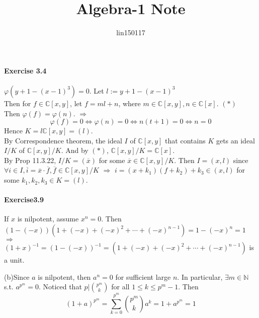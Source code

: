 \documentclass{article}
\title{Algebra-1 Note}
\author{lin150117 }
\date{}
\begin{document}
\setlength{\parindent}{0pt}
\paragraph{Exercise 3.4}


$ \varphi(y+1-(x-1)^3)=0 $. Let  $ l:=y+1-(x-1)^3 $ \\
Then for  $ f\in \mathbb{C}[x,y] $, let  $ f=ml+n $, where  $ m\in \mathbb{C}[x,y],n\in\mathbb{C}[x] $. $ (\ast ) $ \\
Then  $ \varphi(f)=\varphi(n) $. $ \Rightarrow $ 
\[\varphi(f)=0\Leftrightarrow \varphi(n)=0\Leftrightarrow n(t+1)=0\Leftrightarrow n=0\]    
Hence  $ K=l\mathbb{C}[x,y]=(l) $.\\
By Correspondence theorem, the ideal  $ I  $ of  $ \mathbb{C}[x,y] $ that contains  $ K  $  gets an ideal  $ I/K $ of  $ \mathbb{C}[x,y]/K $. And by  $ (\ast)  $,  $ \mathbb{C}[x,y]/K=\mathbb{C}[x] $.\\
By Prop 11.3.22,  $ I/K=(\overline{x}) $ for some  $ \overline{x}\in  \mathbb{C}[x,y]/K  $. Then  $ I=(x,l) $ since  $ \forall i\in I,\overline{i}=\overline{x}\cdot \overline{f},\overline{f}\in \mathbb{C }[x,y]/K $ $ \Rightarrow  $  $ i=(x+k_1)(f+k_2)+k_3\in (x,l) $ for some $ k_1,k_2,k_3\in K=(l) $.  

\paragraph{Exercise3.9}

If  $ x  $ is nilpotent, assume   $ x^n=0 $. Then  $ (1-(-x))(1+(-x)+(-x)^2+\cdots+(-x)^{n-1})=1-(-x)^n=1 $  $ \Rightarrow $  $ (1+x)^{-1}=(1-(-x))^{-1}=(1+(-x)+(-x)^2+\cdots+(-x)^{n-1}) $ is a unit.

(b)Since  $ a  $ is nilpotent, then  $ a^n=0  $ for sufficient large  $ n  $. In particular,  $ \exists m\in \mathbb{N} $ s.t.  $ a^{p^m }=0 $. Noticed that  $ p|\binom{p^m}{k}  $ for all  $ 1 \leq k \leq p^m-1 $. Then
\[(1+a)^{p^m}=\sum_{k=0}^{p^m}\binom{p^m}{k}a^k=1+a^{p^m}=1\] 
\end{document}
